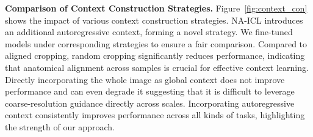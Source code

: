 

\vspace{0.4em}
\noindent\textbf{Comparison of Context Construction Strategies.}  
Figure~\ref{fig:context_con} shows the impact of various context construction strategies. NA-ICL introduces an additional autoregressive context, forming a novel strategy. We fine-tuned models under corresponding strategies to ensure a fair comparison. Compared to aligned cropping, random cropping significantly reduces performance, indicating that anatomical alignment across samples is crucial for effective context learning. Directly incorporating the whole image as global context does not improve performance and can even degrade it suggesting that it is difficult to leverage coarse-resolution guidance directly across scales. Incorporating autoregressive context consistently improves performance across all kinds of tasks, highlighting the strength of our approach.


